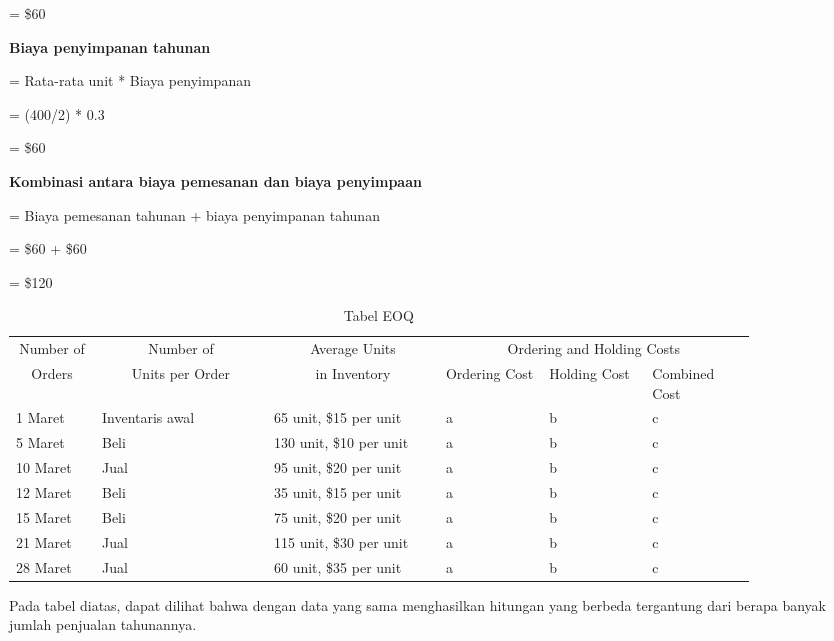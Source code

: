 = \${60}

\textbf{Biaya penyimpanan tahunan}

= Rata-rata unit * Biaya penyimpanan

= (400/2) * 0.3

= \${60}

\textbf{Kombinasi antara biaya pemesanan dan biaya penyimpaan}

= Biaya pemesanan tahunan + biaya penyimpanan tahunan

= \${60} + \${60}

= \${120}

\begin{center}
	\begin{table}[h!]
			  \caption{Tabel EOQ}
			  \label{tab:table4}
			  \begin{tabular}{|p{0.1\linewidth}|p{0.2\linewidth}|p{0.2\linewidth}|p{0.12\linewidth}|p{0.12\linewidth}|p{0.12\linewidth}|} %
			\hline
			\multicolumn{1}{|c|}{Number of} & \multicolumn{1}{|c|}{Number of} & \multicolumn{1}{|c|}{Average Units} & \multicolumn{3}{c|}{Ordering and Holding Costs} \\
			\cline{4-6}
			\multicolumn{1}{|c|}{Orders} & \multicolumn{1}{|c|}{Units per Order} & \multicolumn{1}{|c|}{in Inventory} & Ordering Cost & Holding Cost & Combined Cost \\
			\hline
				1 Maret & Inventaris awal & 65 unit, \${15} per unit & a & b & c\\ \hline
				5 Maret & Beli &  130 unit, \${10} per unit & a & b & c\\ \hline
				10 Maret & Jual &  95 unit, \${20} per unit & a & b & c\\ \hline
				12 Maret & Beli &  35 unit, \${15} per unit & a & b & c\\ \hline
				15 Maret & Beli &  75 unit, \${20} per unit & a & b & c\\ \hline
				21 Maret & Jual &  115 unit, \${30} per unit & a & b & c\\ \hline
				28 Maret & Jual &  60 unit, \${35} per unit & a & b & c\\ \hline
			  \end{tabular}
	\end{table}
\end{center}

Pada tabel diatas, dapat dilihat bahwa dengan data yang sama menghasilkan hitungan yang berbeda tergantung dari berapa banyak jumlah penjualan tahunannya.

